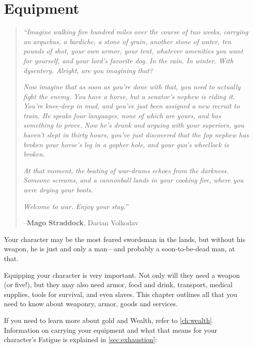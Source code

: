 \documentclass[oneside,11pt,english]{book}
\begin{document}
\chapter{Equipment}\label{ch:equipment}
\clearpage
\begin{quotation}
  \emph{“Imagine walking five hundred miles over the course of two weeks,
    carrying an arquebus, a bardiche, a stone of grain, another stone of water,
    ten pounds of shot, your own armor, your tent, whatever amenities you want
    for yourself, and your lord’s favorite dog. In the rain. In winter. With
    dysentery. Alright, are you imagining that?} 

  \emph{Now imagine that as soon as you’re done with that, you need to actually
    fight the enemy. You have a horse, but a senator’s nephew is riding it.
    You’re knee-deep in mud, and you’ve just been assigned a new recruit to
    train. He speaks four languages, none of which are yours, and has something
    to prove. Now he’s drunk and arguing with your superiors, you haven’t slept
    in thirty hours, you’ve just discovered that the fop nephew has broken your
    horse’s leg in a gopher hole, and your gun’s wheellock is broken.} 

  \emph{At that moment, the beating of war-drums echoes from the darkness.
    Someone screams, and a cannonball lands in your cooking fire, where you were
    drying your boots.} 
  
  \emph{Welcome to war. Enjoy your stay.”}

  \hfill--\textbf{Mago Straddock}, Dacian Volkodav
\end{quotation}
Your character may be the most feared swordsman in the lands, but without his
weapon, he is just and only a man—and probably a soon-to-be-dead man, at that.

Equipping your character is very important. Not only will they need a weapon (or
five!), but they may also need armor, food and drink, transport, medical
supplies, tools for survival, and even slaves. This chapter outlines all that
you need to know about weaponry, armor, goods and services.

If you need to learn more about gold and Wealth, refer to \autoref{ch:wealth}.
Information on carrying your equipment and what that means for your character’s
Fatigue is explained in \autoref{sec:exhaustion}:~
\end{document}
